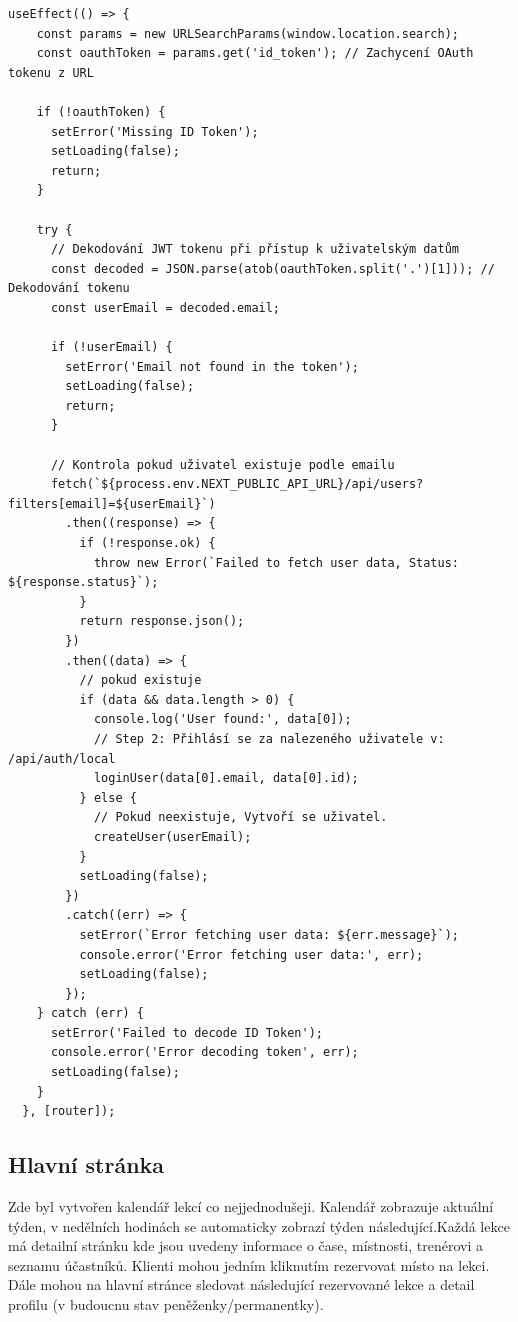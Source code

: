 \documentclass[12pt, a4paper,
openright
]{report}
\begin{document}
\begin{lstlisting}[style=JavaScript, title={Kód}, caption={Ukázka řešení oauth loginu}, basicstyle=\footnotesize\ttfamily]
	useEffect(() => {
    const params = new URLSearchParams(window.location.search);
    const oauthToken = params.get('id_token'); // Zachycení OAuth tokenu z URL

    if (!oauthToken) {
      setError('Missing ID Token');
      setLoading(false);
      return;
    }

    try {
      // Dekodování JWT tokenu při přístup k uživatelským datům
      const decoded = JSON.parse(atob(oauthToken.split('.')[1])); // Dekodování tokenu
      const userEmail = decoded.email; 

      if (!userEmail) {
        setError('Email not found in the token');
        setLoading(false);
        return;
      }

      // Kontrola pokud uživatel existuje podle emailu
      fetch(`${process.env.NEXT_PUBLIC_API_URL}/api/users?filters[email]=${userEmail}`)
        .then((response) => {
          if (!response.ok) {
            throw new Error(`Failed to fetch user data, Status: ${response.status}`);
          }
          return response.json();
        })
        .then((data) => {
          // pokud existuje
          if (data && data.length > 0) {
            console.log('User found:', data[0]);
            // Step 2: Přihlásí se za nalezeného uživatele v: /api/auth/local
            loginUser(data[0].email, data[0].id);
          } else {
            // Pokud neexistuje, Vytvoří se uživatel.
            createUser(userEmail);
          }
          setLoading(false); 
        })
        .catch((err) => {
          setError(`Error fetching user data: ${err.message}`);
          console.error('Error fetching user data:', err);
          setLoading(false);
        });
    } catch (err) {
      setError('Failed to decode ID Token');
      console.error('Error decoding token', err);
      setLoading(false);
    }
  }, [router]);
\end{lstlisting}
\subsection{Hlavní stránka}
Zde byl vytvořen kalendář lekcí co nejjednodušeji. Kalendář zobrazuje aktuální týden, v nedělních hodinách se automaticky zobrazí týden následující.Každá lekce má detailní stránku kde jsou uvedeny informace o čase, místnosti, trenérovi a seznamu účastníků. Klienti mohou jedním kliknutím rezervovat místo na lekci. Dále mohou na hlavní stránce sledovat následující rezervované lekce a detail profilu (v budoucnu stav peněženky/permanentky).
\end{document}
